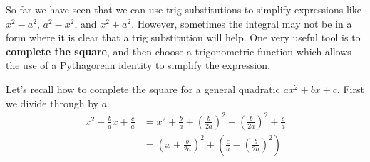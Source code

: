 \documentclass{ximera}
\begin{document}
% 
%
%
%
%
%
%
%

So far we have seen that we can use trig substitutions to simplify expressions
like $x^{2}-a^{2}$, $a^{2}-x^{2}$, and $x^{2}+a^{2}$. 
However, sometimes the integral may not be in a form where it is clear that a trig substitution 
will help. 
One very useful tool is to \textbf{complete the square}, and then choose a
trigonometric function which allows the use of a Pythagorean identity
to simplify the expression. 

Let's recall how to complete the square for a general quadratic $ax^2+bx+c$.  First we divide through by $a$.
\begin{align*}
x^{2}+\frac{b}{a}x+\frac{c}{a} &=x^{2}+\frac{b}{a}+\left(\frac{b}{2a}\right)^{2}-\left(\frac{b}{2a}\right)^{2}+\frac{c}{a} \\
&=\left(x+\frac{b}{2a}\right)^{2}+\left(\frac{c}{a}-\left(\frac{b}{2a}\right)^{2}\right)
\end{align*}
\end{document}
